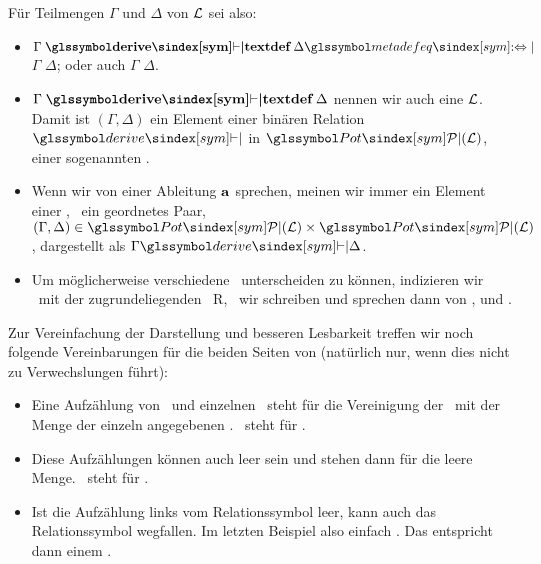 Für Teilmengen $\Gamma$ und $\Delta$ von $\mathcal{L}$ sei also:
\begin{itemize}
	\item $\Gamma \bindefinition{\symderive} \Delta \symmetadefeq$ $\Gamma$  $\Delta$; oder auch $\Gamma$  $\Delta$.
	\item $\Gamma \bindefinition{\symderive} \Delta$ nennen wir auch eine   $\mathcal{L}$.
	Damit ist $(\Gamma,\Delta)$ ein Element einer binären Relation $\symderive$ in $\formulaSetSet$, einer sogenannten .
	\item Wenn wir von einer Ableitung $\mathbf{a}$ sprechen, meinen wir immer ein Element einer \Ableitungsrelation, \textdh\ ein geordnetes Paar, \textzB\ $(\Gamma, \Delta) \in \formulaSetSet \times \formulaSetSet$, dargestellt als $\Gamma \symderive \Delta$.
	\item Um möglicherweise verschiedene \Ableitungsrelationen\ unterscheiden zu können, indizieren wir  \textggf\ mit der zugrundeliegenden \Relation\ R, \textdh\ wir schreiben  und sprechen dann von ,  und .
\end{itemize}
%
Zur Vereinfachung der Darstellung und besseren Lesbarkeit treffen wir noch folgende Vereinbarungen für die beiden Seiten von \seqqt{$\Gamma \symderive \Delta$} (natürlich nur, wenn dies nicht zu Verwechslungen führt):
\begin{itemize}
	\item Eine Aufzählung von \Formelmengen\ und einzelnen \Formeln\ steht für die Vereinigung der \Formelmengen\ mit der Menge der einzeln angegebenen \Formeln.
	\textZB\ steht \seqqt{$\Gamma, \alpha \symderive \beta$} für \seqqt{$(\Gamma \cup \{\alpha\}) \symderive \{\beta\}$}.
	\item Diese Aufzählungen können auch leer sein und stehen dann für die leere Menge. \textZB\ steht \seqqt{$\symderive\; \alpha \symlimp (\beta \symlimp \alpha)$} für \seqqt{$\emptyset \symderive \{\alpha \symlimp (\beta \symlimp \alpha)\}$}.
	\item Ist die Aufzählung links vom Relationssymbol \chrqt{\symderive} leer, kann auch das Relationssymbol wegfallen.
	Im letzten Beispiel also einfach \seqqt{$\{\alpha \symlimp (\beta \symlimp \alpha)\}$}.
	Das entspricht dann einem .
\end{itemize}
